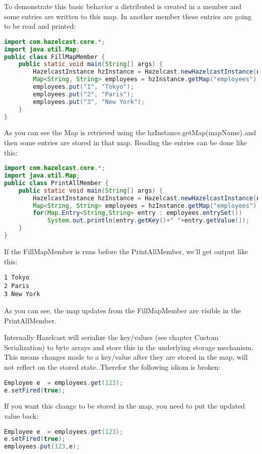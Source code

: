 To demonstrate this basic behavior a distributed is created in a member and some entries are written to this map. In another member these entries are going to be read and printed:
\begin{lstlisting}[language=java]
import com.hazelcast.core.*;
import java.util.Map;
public class FillMapMember {
    public static void main(String[] args) {
        HazelcastInstance hzInstance = Hazelcast.newHazelcastInstance(null);
        Map<String, String> employees = hzInstance.getMap("employees");
        employees.put("1", "Tokyo");
        employees.put("2", "Paris");
        employees.put("3", "New York");
    }
}
\end{lstlisting}
As you can see the Map is retrieved using the hzInstance.getMap(mapName) and then some entries are stored in that map. Reading the entries can be done like this:
\begin{lstlisting}[language=java]
import com.hazelcast.core.*;
import java.util.Map;
public class PrintAllMember {
    public static void main(String[] args) {
        HazelcastInstance hzInstance = Hazelcast.newHazelcastInstance(null);
        Map<String, String> employees = hzInstance.getMap("employees");
        for(Map.Entry<String,String> entry : employees.entrySet())
            System.out.println(entry.getKey()+" "+entry.getValue());
    }
}
\end{lstlisting}
If the FillMapMember is runs before the PrintAllMember, we'll get output like this:
\begin{lstlisting}
1 Tokyo
2 Paris
3 New York
\end{lstlisting}
As you can see, the map updates from the FillMapMember are visible in the PrintAllMember.

Internally Hazelcast will serialize the key/values (see chapter Custom Serialization) to byte arrays and store this in the underlying storage mechanism. This means changes made to a key/value after they are stored in the map, will not reflect on the stored state. Therefor the following idiom is broken:
\begin{lstlisting}[language=java]
Employee e  = employees.get(123);
e.setFired(true);
\end{lstlisting}
If you want this change to be stored in the map, you need to put the updated value back:
\begin{lstlisting}[language=java]
Employee e  = employees.get(123);
e.setFired(true);
employees.put(123,e);
\end{lstlisting}

